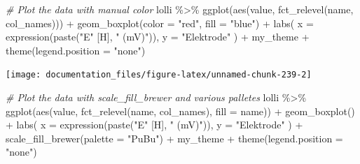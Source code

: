 \documentclass[
]{article}
\newenvironment{Shaded}{\begin{snugshade}}{\end{snugshade}}
\newcommand{\AttributeTok}[1]{\textcolor[rgb]{0.77,0.63,0.00}{#1}}
\newcommand{\CommentTok}[1]{\textcolor[rgb]{0.56,0.35,0.01}{\textit{#1}}}
\newcommand{\FunctionTok}[1]{\textcolor[rgb]{0.00,0.00,0.00}{#1}}
\newcommand{\NormalTok}[1]{#1}
\newcommand{\SpecialCharTok}[1]{\textcolor[rgb]{0.00,0.00,0.00}{#1}}
\newcommand{\StringTok}[1]{\textcolor[rgb]{0.31,0.60,0.02}{#1}}
\begin{document}
\begin{Shaded}
\begin{Highlighting}[]

\CommentTok{\# Plot the data with manual color}
\NormalTok{lolli }\SpecialCharTok{\%\textgreater{}\%}
  \FunctionTok{ggplot}\NormalTok{(}\FunctionTok{aes}\NormalTok{(value, }\FunctionTok{fct\_relevel}\NormalTok{(name, col\_names))) }\SpecialCharTok{+} 
  \FunctionTok{geom\_boxplot}\NormalTok{(}\AttributeTok{color =} \StringTok{"red"}\NormalTok{, }\AttributeTok{fill =} \StringTok{"blue"}\NormalTok{) }\SpecialCharTok{+}
  \FunctionTok{labs}\NormalTok{(}
    \AttributeTok{x =} \FunctionTok{expression}\NormalTok{(}\FunctionTok{paste}\NormalTok{(}\StringTok{"E"}\NormalTok{ [H], }\StringTok{" (mV)"}\NormalTok{)),}
    \AttributeTok{y =} \StringTok{"Elektrode"}
\NormalTok{  ) }\SpecialCharTok{+}
\NormalTok{  my\_theme }\SpecialCharTok{+}
  \FunctionTok{theme}\NormalTok{(}\AttributeTok{legend.position =} \StringTok{"none"}\NormalTok{)}
\end{Highlighting}
\end{Shaded}

\begin{center}\texttt{[image: documentation\_files/figure-latex/unnamed-chunk-239-2]} \end{center}

\begin{Shaded}
\begin{Highlighting}[]

\CommentTok{\# Plot the data with scale\_fill\_brewer and various palletes}
\NormalTok{lolli }\SpecialCharTok{\%\textgreater{}\%}
  \FunctionTok{ggplot}\NormalTok{(}\FunctionTok{aes}\NormalTok{(value, }\FunctionTok{fct\_relevel}\NormalTok{(name, col\_names), }\AttributeTok{fill =}\NormalTok{ name)) }\SpecialCharTok{+} 
  \FunctionTok{geom\_boxplot}\NormalTok{() }\SpecialCharTok{+}
  \FunctionTok{labs}\NormalTok{(}
    \AttributeTok{x =} \FunctionTok{expression}\NormalTok{(}\FunctionTok{paste}\NormalTok{(}\StringTok{"E"}\NormalTok{ [H], }\StringTok{" (mV)"}\NormalTok{)),}
    \AttributeTok{y =} \StringTok{"Elektrode"}
\NormalTok{  ) }\SpecialCharTok{+}
  \FunctionTok{scale\_fill\_brewer}\NormalTok{(}\AttributeTok{palette =} \StringTok{"PuBu"}\NormalTok{) }\SpecialCharTok{+}
\NormalTok{  my\_theme }\SpecialCharTok{+}
  \FunctionTok{theme}\NormalTok{(}\AttributeTok{legend.position =} \StringTok{"none"}\NormalTok{)}
\end{Highlighting}
\end{Shaded}
\end{document}
